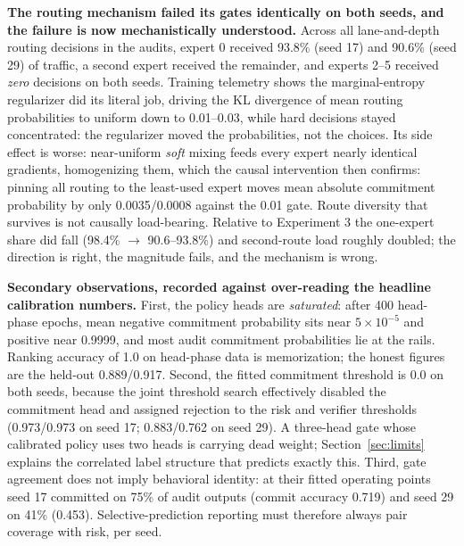 \documentclass[10pt,a4paper]{article}
\begin{document}
\textbf{The routing mechanism failed its gates identically on both seeds, and
the failure is now mechanistically understood.} Across all lane-and-depth
routing decisions in the audits, expert 0 received 93.8\% (seed 17) and
90.6\% (seed 29) of traffic, a second expert received the remainder, and
experts 2--5 received \emph{zero} decisions on both seeds. Training telemetry
shows the marginal-entropy regularizer did its literal job, driving the KL
divergence of mean routing probabilities to uniform down to 0.01--0.03,
while hard decisions stayed concentrated: the regularizer moved the
probabilities, not the choices. Its side effect is worse: near-uniform
\emph{soft} mixing feeds every expert nearly identical gradients,
homogenizing them, which the causal intervention then confirms: pinning
all routing to the least-used expert moves mean absolute commitment
probability by only 0.0035/0.0008 against the 0.01 gate. Route diversity that
survives is not causally load-bearing. Relative to Experiment 3 the one-expert
share did fall (98.4\% $\rightarrow$ 90.6--93.8\%) and second-route load
roughly doubled; the direction is right, the magnitude fails, and the
mechanism is wrong.

\textbf{Secondary observations, recorded against over-reading the headline
calibration numbers.} First, the policy heads are \emph{saturated}: after 400
head-phase epochs, mean negative commitment probability sits near
$5 \times 10^{-5}$ and positive near 0.9999, and most audit commitment
probabilities lie at the rails. Ranking accuracy of 1.0 on head-phase data is
memorization; the honest figures are the held-out 0.889/0.917. Second, the
fitted commitment threshold is 0.0 on both seeds, because the joint threshold
search effectively disabled the commitment head and assigned rejection to the
risk and verifier thresholds (0.973/0.973 on seed 17; 0.883/0.762 on seed
29). A three-head gate whose calibrated policy uses two heads is carrying
dead weight; Section~\ref{sec:limits} explains the correlated label structure
that predicts exactly this. Third, gate agreement does not imply behavioral
identity: at their fitted operating points seed 17 committed on 75\% of audit
outputs (commit accuracy 0.719) and seed 29 on 41\% (0.453).
Selective-prediction reporting must therefore always pair coverage with risk,
per seed.
\end{document}
